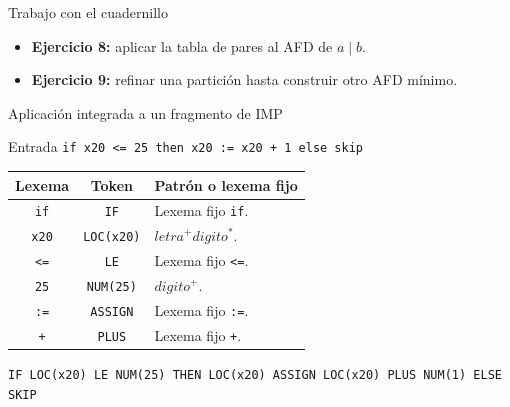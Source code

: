 \documentclass[11pt,spanish]{beamer}
\newcommand{\actividad}[1]{\textbf{\textcolor{Rojo}{#1}}}
\begin{document}
\begin{frame}{Trabajo con el cuadernillo}
\vfill

\begin{center}
\end{center}

\bigskip
\begin{itemize}
\item \textbf{Ejercicio 8:} aplicar la tabla de pares al AFD de \(a\mid b\).
\item \textbf{Ejercicio 9:} refinar una partición hasta construir otro AFD mínimo.
\end{itemize}

\vfill
\end{frame}

\begin{frame}{Aplicación integrada a un fragmento de IMP}
\vfill

\begin{block}{Entrada}
\centering
\texttt{if x20 <= 25 then x20 := x20 + 1 else skip}
\end{block}

\bigskip
\begin{center}
\scriptsize
\renewcommand{\arraystretch}{1.18}
\begin{tabular}{|c|c|L{.43\textwidth}|}
\hline
\textbf{Lexema} & \textbf{Token} & \textbf{Patrón o lexema fijo} \tabularnewline
\hline
\texttt{if} & \texttt{IF} & Lexema fijo \texttt{if}. \tabularnewline
\hline
\texttt{x20} & \texttt{LOC(x20)} & \(\mathit{letra}^{+}\mathit{digito}^{*}\). \tabularnewline
\hline
\texttt{<=} & \texttt{LE} & Lexema fijo \texttt{<=}. \tabularnewline
\hline
\texttt{25} & \texttt{NUM(25)} & \(\mathit{digito}^{+}\). \tabularnewline
\hline
\texttt{:=} & \texttt{ASSIGN} & Lexema fijo \texttt{:=}. \tabularnewline
\hline
\texttt{+} & \texttt{PLUS} & Lexema fijo \texttt{+}. \tabularnewline
\hline
\end{tabular}
\end{center}

\bigskip
\begin{center}
\scriptsize \texttt{IF LOC(x20) LE NUM(25) THEN LOC(x20) ASSIGN LOC(x20) PLUS NUM(1) ELSE SKIP}
\end{center}

\vfill
\end{frame}
\end{document}
